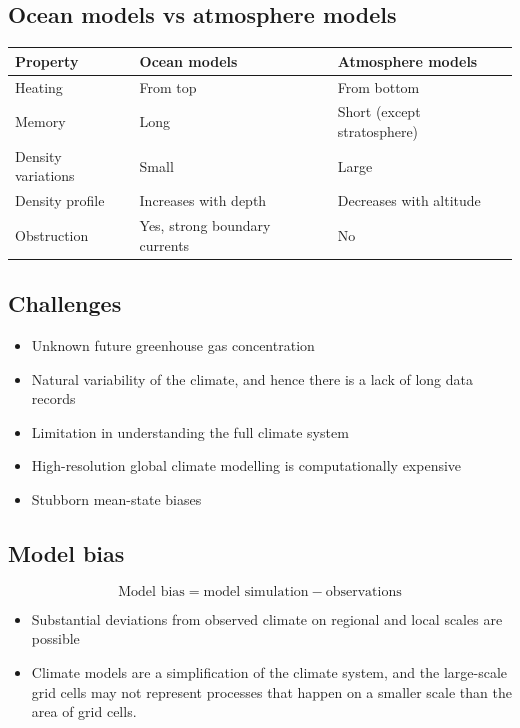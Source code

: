 \documentclass[11pt]{article}
\begin{document}
\subsection{Ocean models vs atmosphere models}
\label{sec:org5e68148}
\begin{center}
\begin{tabular}{lll}
\textbf{Property} & \textbf{Ocean models} & \textbf{Atmosphere models}\\[0pt]
\hline
Heating & From top & From bottom\\[0pt]
Memory & Long & Short (except stratosphere)\\[0pt]
Density variations & Small & Large\\[0pt]
Density profile & Increases with depth & Decreases with altitude\\[0pt]
Obstruction & Yes, strong boundary currents & No\\[0pt]
\end{tabular}
\end{center}

\newpage

\subsection{Challenges}
\label{sec:orgcf6a7d7}
\begin{itemize}
\item Unknown future greenhouse gas concentration
\item Natural variability of the climate, and hence there is a lack of long data records
\item Limitation in understanding the full climate system
\item High-resolution global climate modelling is computationally expensive
\item Stubborn mean-state biases
\end{itemize}

\subsection{Model bias}
\label{sec:org955e50c}
\[\text{Model bias} = \text{model simulation} - \text{observations}\]

\begin{itemize}
\item Substantial deviations from observed climate on regional and local scales are possible
\item Climate models are a simplification of the climate system, and the large-scale grid cells may not represent processes that happen on a smaller scale than the area of grid cells.
\end{itemize}
\end{document}
